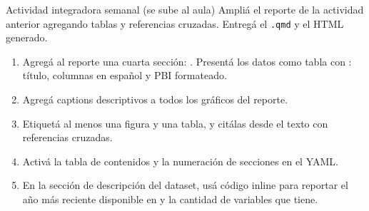 \documentclass[8pt]{beamer}
\begin{document}
	\begin{frame}[fragile]{Actividad integradora semanal (se sube al aula)}
		Ampliá el reporte de la actividad anterior agregando tablas y referencias cruzadas. Entregá el \texttt{.qmd} y el HTML generado.

		\begin{enumerate}
			\item Agregá al reporte una cuarta sección: . Presentá los datos como tabla con : título, columnas en español y PBI formateado.

			\item Agregá captions descriptivos a todos los gráficos del reporte.

			\item Etiquetá al menos una figura y una tabla, y citálas desde el texto con referencias cruzadas.

			\item Activá la tabla de contenidos y la numeración de secciones en el YAML.

			\item En la sección de descripción del dataset, usá código inline para reportar el año más reciente disponible en  y la cantidad de variables que tiene.
		\end{enumerate}
	\end{frame}
\end{document}

